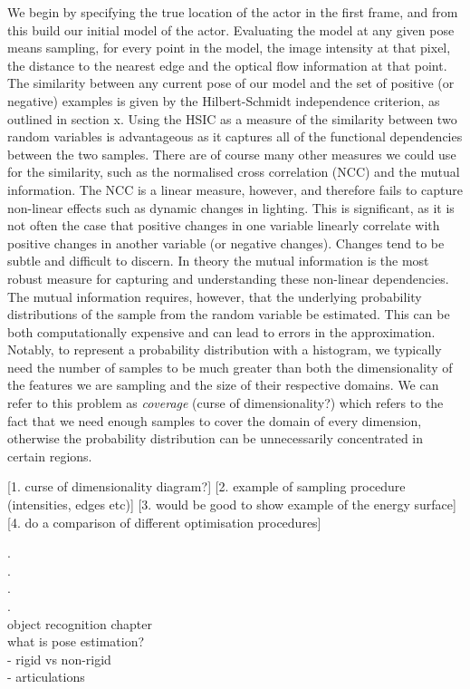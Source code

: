 We begin by specifying the true location of the actor in the first frame, and from this build our initial model of the actor. Evaluating the model at any given pose means sampling, for every point in the model, the image intensity at that pixel, the distance to the nearest edge and the optical flow information at that point. The similarity between any current pose of our model and the set of positive (or negative) examples is given by the Hilbert-Schmidt independence criterion, as outlined in section x. Using the HSIC as a measure of the similarity between two random variables is advantageous as it captures all of the functional dependencies between the two samples. There are of course many other measures we could use for the similarity, such as the normalised cross correlation (NCC) and the mutual information. The NCC is a linear measure, however, and therefore fails to capture non-linear effects such as dynamic changes in lighting. This is significant, as it is not often the case that positive changes in one variable linearly correlate with positive changes in another variable (or negative changes). Changes tend to be subtle and difficult to discern. In theory the mutual information is the most robust measure for capturing and understanding these non-linear dependencies. The mutual information requires, however, that the underlying probability distributions of the sample from the random variable be estimated. This can be both computationally expensive and can lead to errors in the approximation. Notably, to represent a probability distribution with a histogram, we typically need the number of samples to be much greater than both the dimensionality of the features we are sampling and the size of their respective domains. We can refer to this problem as \textit{coverage} (curse of dimensionality?) which refers to the fact that we need enough samples to cover the domain of every dimension, otherwise the probability distribution can be unnecessarily concentrated in certain regions.



[1. curse of dimensionality diagram?]
[2. example of sampling procedure (intensities, edges etc)]
[3. would be good to show example of the energy surface]
[4. do a comparison of different optimisation procedures]


.\\
.\\
.\\
.\\


object recognition chapter\\
what is pose estimation?\\
	- rigid vs non-rigid\\
	- articulations\\


